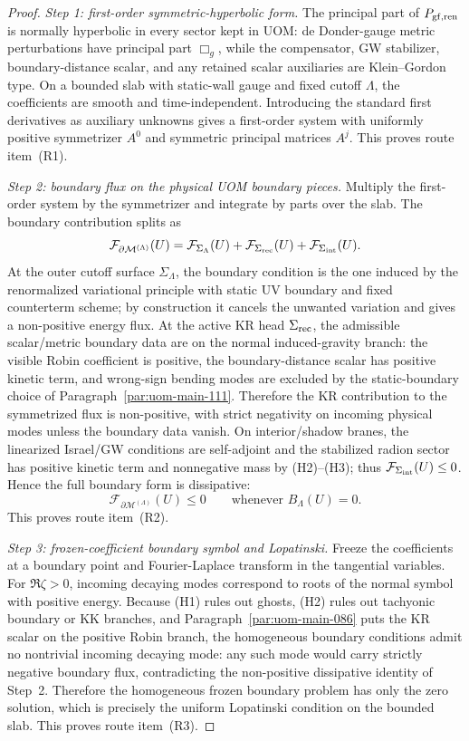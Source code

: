 \documentclass[10pt]{article}
\theoremstyle{definition}
\theoremstyle{plain}
\begin{document}
\begin{proof}
\emph{Step 1: first-order symmetric-hyperbolic form.}
The principal part of $P_{\rm gf,ren}$ is normally hyperbolic in every sector kept in UOM: de Donder-gauge metric perturbations have principal
part $\Box_g$, while the compensator, GW stabilizer, boundary-distance scalar, and any retained scalar auxiliaries are Klein--Gordon type.
On a bounded slab with static-wall gauge and fixed cutoff $\Lambda$, the coefficients are smooth and time-independent.  Introducing the standard
first derivatives as auxiliary unknowns gives a first-order system with uniformly positive symmetrizer $A^0$ and symmetric principal matrices
$A^j$.  This proves route item~\textnormal{(R1)}.

\emph{Step 2: boundary flux on the physical UOM boundary pieces.}
Multiply the first-order system by the symmetrizer and integrate by parts over the slab.  The boundary contribution splits as
\[
\mathcal F_{\partial\mathcal M^{(\Lambda)}}(U)
= \mathcal F_{\Sigma_\Lambda}(U)+\mathcal F_{\Sigma_{\rm rec}}(U)+\mathcal F_{\Sigma_{\rm int}}(U).
\]
At the outer cutoff surface $\Sigma_\Lambda$, the boundary condition is the one induced by the renormalized variational principle with static UV
boundary and fixed counterterm scheme; by construction it cancels the unwanted variation and gives a non-positive energy flux.
At the active KR head $\Sigma_{\rm rec}$, the admissible scalar/metric boundary data are on the normal induced-gravity branch: the visible Robin
coefficient is positive, the boundary-distance scalar has positive kinetic term, and wrong-sign bending modes are excluded by the static-boundary
choice of Paragraph~\ref{par:uom-main-111}.  Therefore the KR contribution to the symmetrized flux is non-positive, with strict negativity on
incoming physical modes unless the boundary data vanish.  On interior/shadow branes, the linearized Israel/GW conditions are self-adjoint and the
stabilized radion sector has positive kinetic term and nonnegative mass by \textnormal{(H2)}--\textnormal{(H3)}; thus
$\mathcal F_{\Sigma_{\rm int}}(U)\le 0$.  Hence the full boundary form is dissipative:
\[
\mathcal F_{\partial\mathcal M^{(\Lambda)}}(U)\le 0
\qquad\text{whenever }B_\Lambda(U)=0.
\]
This proves route item~\textnormal{(R2)}.

\emph{Step 3: frozen-coefficient boundary symbol and Lopatinski.}
Freeze the coefficients at a boundary point and Fourier-Laplace transform in the tangential variables.  For $\Re\zeta>0$, incoming decaying
modes correspond to roots of the normal symbol with positive energy.  Because \textnormal{(H1)} rules out ghosts, \textnormal{(H2)} rules out
tachyonic boundary or KK branches, and Paragraph~\ref{par:uom-main-086} puts the KR scalar on the positive Robin branch, the homogeneous
boundary conditions admit no nontrivial incoming decaying mode: any such mode would carry strictly negative boundary flux, contradicting the
non-positive dissipative identity of Step~2.  Therefore the homogeneous frozen boundary problem has only the zero solution, which is precisely
the uniform Lopatinski condition on the bounded slab.  This proves route item~\textnormal{(R3)}.


\end{proof}
\end{document}

